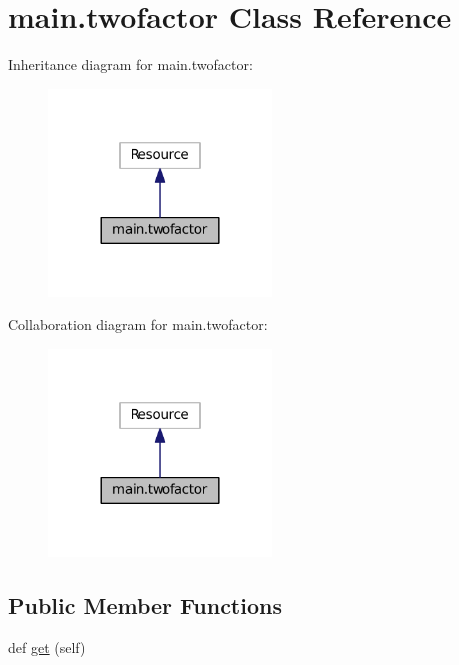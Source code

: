 \hypertarget{classmain_1_1twofactor}{}\section{main.\+twofactor Class Reference}
\label{classmain_1_1twofactor}


Inheritance diagram for main.\+twofactor\+:
\nopagebreak
\begin{figure}[H]
\begin{center}
\leavevmode
\includegraphics[width=168pt]{classmain_1_1twofactor__inherit__graph}
\end{center}
\end{figure}


Collaboration diagram for main.\+twofactor\+:
\nopagebreak
\begin{figure}[H]
\begin{center}
\leavevmode
\includegraphics[width=168pt]{classmain_1_1twofactor__coll__graph}
\end{center}
\end{figure}
\subsection*{Public Member Functions}
\begin{DoxyCompactItemize}
\item 
def \hyperlink{classmain_1_1twofactor_a87a3b360a2540681f4620d2820f8bb31}{get} (self)
\end{DoxyCompactItemize}


